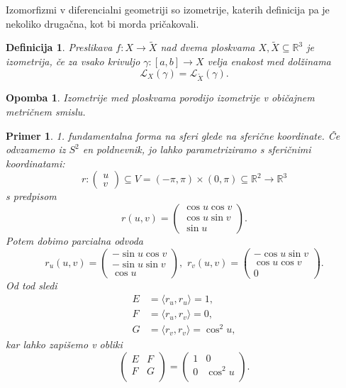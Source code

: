\documentclass[10pt, a4paper]{article}
\newtheorem{defi}[izr]{Definicija}
\newenvironment{noticeB}{%
  \tcolorbox[%
  notitle,
  empty,
  enhanced,  %
  breakable,
  coltext=black,
  colback=white, 
  fontupper=\rmfamily,
  noparskip,
  sharp corners,
  boxrule=-1pt,  %
  frame hidden,
  left=7pt,  %
  right=7pt,
  top=5pt,
  bottom=5pt,
  before skip=2.5ex plus 2pt,
  after skip=2.5ex plus 2pt,
  borderline west = {1.5pt}{-0.1pt}{blue!30!black}, %
  overlay unbroken and last={%
    \draw[color=black, line width=1.25pt]
    ($(frame.south west)+(1.pt, -0.1pt)$) -- ++(2em, 0);
  }
  ]}
{\endtcolorbox}
\newenvironment{definicija}{\begin{noticeB}\begin{defi}}{%
\end{defi}\end{noticeB}}
\newtheorem*{opomba}{Opomba}
\newtheorem{primer}[izr]{Primer}
\begin{document}
Izomorfizmi v diferencialni geometriji so izometrije, katerih
definicija pa je nekoliko drugačna, kot bi morda pričakovali.

\begin{definicija}
\label{def_izometrija}
 Preslikava $f: X \to \tilde{X}$ nad dvema ploskvama $X, \tilde{X} \subseteq
 \mathbb{R}^3$ je izometrija, če za vsako krivuljo $\gamma: \left[ a,b
 \right] \to  X$ velja enakost med dolžinama 
 \[ \mathcal{L}_X(\gamma) = \mathcal{L}_{\tilde{X}}(\gamma). \]
\end{definicija}

\begin{opomba}
 Izometrije med ploskvama porodijo izometrije v običajnem metričnem
 smislu.
\end{opomba}

\begin{primer}
 1. fundamentalna forma na sferi glede na sferične koordinate. Če
 odvzamemo iz $S^2$ en poldnevnik, jo lahko parametriziramo s
 sferičnimi koordinatami: 
 \[ r: \begin{pmatrix}
 	u \\ v
 \end{pmatrix} \subseteq  V = \left( -\pi, \pi \right) \times \left(
 0, \pi  \right) \subseteq  \mathbb{R}^2 \to  \mathbb{R}^3
  \] s predpisom \[ r(u,v) = 
\begin{pmatrix}\cos u \cos v \\ \cos u \sin v \\ \sin u
\end{pmatrix}.\]
Potem dobimo parcialna odvoda 
\[   r_u(u,v) = \begin{pmatrix}-\sin u \cos v \\ -\sin u \sin v \\ \cos u
\end{pmatrix}, \,\,  r_v(u,v) = 
\begin{pmatrix}-\cos u \sin  v \\ \cos u \cos v \\ 0
\end{pmatrix}.\]
Od tod sledi 
\[ \begin{align*}
    E &= \langle r_u, r_u \rangle = 1, \\
    F &= \langle r_u, r_v \rangle = 0, \\
	G &= \langle r_v, r_v \rangle = \cos^2 u,
\end{align*} \] kar lahko zapišemo v obliki 
\[ 
\begin{pmatrix}
	E & F \\
	F & G \\
\end{pmatrix}
=
\begin{pmatrix}
	1 & 0 \\
	0 & \cos^2 u \\
\end{pmatrix}
.
\]
\end{primer}
\end{document}
